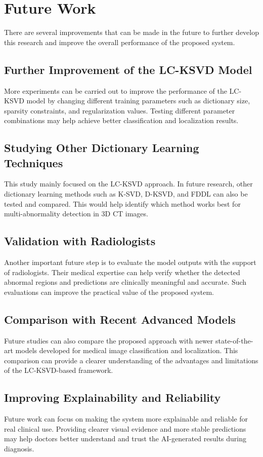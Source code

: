 ﻿\chapter{Future Work}
\label{ch:futurework}

There are several improvements that can be made in the future to further develop this research and improve the overall performance of the proposed system.

\section{Further Improvement of the LC-KSVD Model}

More experiments can be carried out to improve the performance of the LC-KSVD model by changing different training parameters such as dictionary size, sparsity constraints, and regularization values. Testing different parameter combinations may help achieve better classification and localization results.

\section{Studying Other Dictionary Learning Techniques}

This study mainly focused on the LC-KSVD approach. In future research, other dictionary learning methods such as K-SVD, D-KSVD, and FDDL can also be tested and compared. This would help identify which method works best for multi-abnormality detection in 3D CT images.

\section{Validation with Radiologists}

Another important future step is to evaluate the model outputs with the support of radiologists. Their medical expertise can help verify whether the detected abnormal regions and predictions are clinically meaningful and accurate. Such evaluations can improve the practical value of the proposed system.

\section{Comparison with Recent Advanced Models}

Future studies can also compare the proposed approach with newer state-of-the-art models developed for medical image classification and localization. This comparison can provide a clearer understanding of the advantages and limitations of the LC-KSVD-based framework.

\section{Improving Explainability and Reliability}

Future work can focus on making the system more explainable and reliable for real clinical use. Providing clearer visual evidence and more stable predictions may help doctors better understand and trust the AI-generated results during diagnosis.


